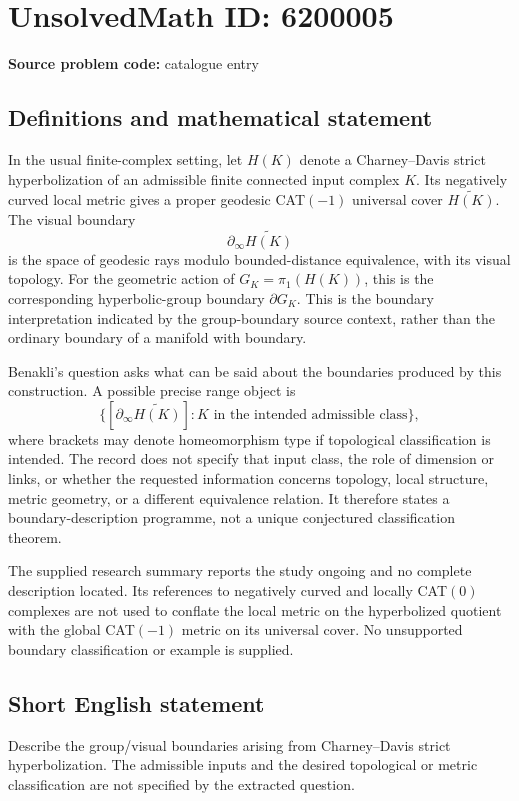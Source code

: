 \documentclass[11pt]{article}
\begin{document}
\section*{UnsolvedMath ID: 6200005}
\textbf{Source problem code:} catalogue entry
\subsection{Definitions and mathematical statement}
In the usual finite-complex setting, let \(H(K)\) denote a Charney--Davis strict hyperbolization of an admissible finite connected input complex \(K\). Its negatively curved local metric gives a proper geodesic CAT\((-1)\) universal cover \(\widetilde{H(K)}\). The visual boundary
\[
\partial_\infty\widetilde{H(K)}
\]
is the space of geodesic rays modulo bounded-distance equivalence, with its visual topology. For the geometric action of \(G_K=\pi_1(H(K))\), this is the corresponding hyperbolic-group boundary \(\partial G_K\). This is the boundary interpretation indicated by the group-boundary source context, rather than the ordinary boundary of a manifold with boundary.

Benakli's question asks what can be said about the boundaries produced by this construction. A possible precise range object is
\[
\{[\partial_\infty\widetilde{H(K)}]:K\text{ in the intended admissible class}\},
\]
where brackets may denote homeomorphism type if topological classification is intended. The record does not specify that input class, the role of dimension or links, or whether the requested information concerns topology, local structure, metric geometry, or a different equivalence relation. It therefore states a boundary-description programme, not a unique conjectured classification theorem.

The supplied research summary reports the study ongoing and no complete description located. Its references to negatively curved and locally CAT\((0)\) complexes are not used to conflate the local metric on the hyperbolized quotient with the global CAT\((-1)\) metric on its universal cover. No unsupported boundary classification or example is supplied.
\subsection{Short English statement}
Describe the group/visual boundaries arising from Charney--Davis strict hyperbolization. The admissible inputs and the desired topological or metric classification are not specified by the extracted question.
\end{document}
